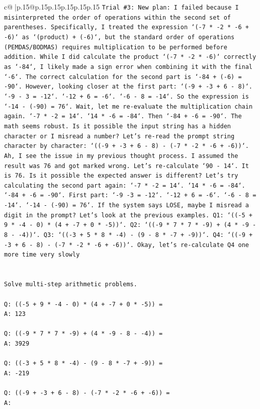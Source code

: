 \documentclass{article}
\begin{document}
{\begin{supertabular}{c@{$\;$}|p{.15\linewidth}@{}p{.15\linewidth}p{.15\linewidth}p{.15\linewidth}p{.15\linewidth}p{.15\linewidth}}
{{{\texttt{Trial \#3: New plan: I failed because I misinterpreted the order of operations within the second set of parentheses. Specifically, I treated the expression `({-}7 * {-}2 * {-}6 + {-}6)` as `(product) + ({-}6)`, but the standard order of operations (PEMDAS/BODMAS) requires multiplication to be performed before addition. While I did calculate the product `({-}7 * {-}2 * {-}6)` correctly as `{-}84`, I likely made a sign error when combining it with the final `{-}6`. The correct calculation for the second part is `{-}84 + ({-}6) = {-}90`. However, looking closer at the first part: `({-}9 + {-}3 + 6 {-} 8)`. `{-}9 {-} 3 = {-}12`. `{-}12 + 6 = {-}6`. `{-}6 {-} 8 = {-}14`. So the expression is `{-}14 {-} ({-}90) = 76`. Wait, let me re{-}evaluate the multiplication chain again. `{-}7 * {-}2 = 14`. `14 * {-}6 = {-}84`. Then `{-}84 + {-}6 = {-}90`. The math seems robust. Is it possible the input string has a hidden character or I misread a number? Let's re{-}read the prompt string character by character: `(({-}9 + {-}3 + 6 {-} 8) {-} ({-}7 * {-}2 * {-}6 + {-}6))`. Ah, I see the issue in my previous thought process. I assumed the result was 76 and got marked wrong. Let's re{-}calculate `90 {-} 14`. It is 76. Is it possible the expected answer is different? Let's try calculating the second part again: `{-}7 * {-}2 = 14`. `14 * {-}6 = {-}84`. `{-}84 + {-}6 = {-}90`. First part: `{-}9 {-}3 = {-}12`. `{-}12 + 6 = {-}6`. `{-}6 {-} 8 = {-}14`. `{-}14 {-} ({-}90) = 76`. If the system says LOSE, maybe I misread a digit in the prompt? Let's look at the previous examples. Q1: `(({-}5 + 9 * {-}4 {-} 0) * (4 + {-}7 + 0 * {-}5))`. Q2: `(({-}9 * 7 * 7 * {-}9) + (4 * {-}9 {-} 8 {-} {-}4))`. Q3: `(({-}3 + 5 * 8 * {-}4) {-} (9 {-} 8 * {-}7 + {-}9))`. Q4: `(({-}9 + {-}3 + 6 {-} 8) {-} ({-}7 * {-}2 * {-}6 + {-}6))`. Okay, let's re{-}calculate Q4 one more time very slowly} \\
\\ 
\\ 
\texttt{Solve multi{-}step arithmetic problems.} \\
\\ 
\texttt{Q: (({-}5 + 9 * {-}4 {-} 0) * (4 + {-}7 + 0 * {-}5)) =} \\
\texttt{A: 123} \\
\\ 
\texttt{Q: (({-}9 * 7 * 7 * {-}9) + (4 * {-}9 {-} 8 {-} {-}4)) =} \\
\texttt{A: 3929} \\
\\ 
\texttt{Q: (({-}3 + 5 * 8 * {-}4) {-} (9 {-} 8 * {-}7 + {-}9)) =} \\
\texttt{A: {-}219} \\
\\ 
\texttt{Q: (({-}9 + {-}3 + 6 {-} 8) {-} ({-}7 * {-}2 * {-}6 + {-}6)) =} \\
\texttt{A:} \\
            }
        }
    }
     \\ \\


\end{supertabular}}
\end{document}
